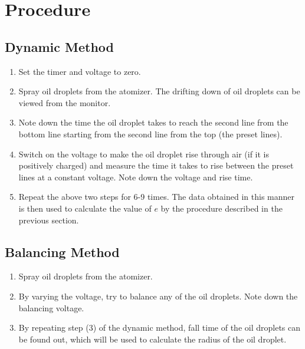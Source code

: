 \section{Procedure}

\subsection{Dynamic Method}

\begin{enumerate}
    \item Set the timer and voltage to zero.
    \item Spray oil droplets from the atomizer. The drifting down
    of oil droplets can be viewed from the monitor.
    \item Note down the time the oil droplet takes to reach the second
    line from the bottom line starting from the second line
    from the top (the preset lines). 
    \item Switch on the voltage to
    make the oil droplet rise through air (if it is positively
    charged) and measure the time it takes to rise between
    the preset lines at a constant voltage. Note down the
    voltage and rise time.
    \item Repeat the above two steps for
    6-9 times. The data obtained in this manner is then used
    to calculate the value of $e$ by the procedure described in
    the previous section.
\end{enumerate}

\subsection{Balancing Method}

\begin{enumerate}
    \item Spray oil droplets from the
    atomizer.
    \item By varying the voltage, try to balance any of
    the oil droplets. Note down the balancing voltage.
    \item By repeating step (3) of the dynamic method, fall time of the oil droplets can be found out, which will be used to
    calculate the radius of the oil droplet.
\end{enumerate}